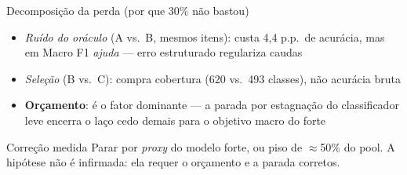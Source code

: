 \documentclass[aspectratio=169,11pt]{beamer}
\begin{document}
\begin{frame}{Decomposição da perda (por que 30\% não bastou)}
\begin{itemize}
  \item \emph{Ruído do oráculo} (A vs.\ B, mesmos itens): custa 4,4 p.p.\ de
        acurácia, mas em Macro F1 \emph{ajuda} --- erro estruturado regulariza caudas
  \item \emph{Seleção} (B vs.\ C): compra cobertura (620 vs.\ 493 classes), não acurácia bruta
  \item \textbf{Orçamento}: é o fator dominante --- a parada por estagnação do
        classificador leve encerra o laço cedo demais para o objetivo macro do forte
\end{itemize}
\vspace{0.4em}
\begin{block}{Correção medida}
\footnotesize Parar por \textit{proxy} do modelo forte, ou piso de $\approx$50\%
do pool. A hipótese não é infirmada: ela requer o orçamento e a parada corretos.
\end{block}
\end{frame}


\end{document}

